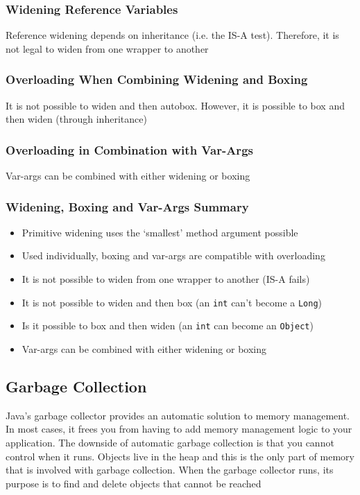 \subsubsection{Widening Reference Variables}
Reference widening depends on inheritance (i.e. the IS-A test). Therefore, it 
is not legal to widen from one wrapper to another

\subsubsection{Overloading When Combining Widening and Boxing}
It is not possible to widen and then autobox. However, it is possible to box 
and then widen (through inheritance)

\subsubsection{Overloading in Combination with Var-Args}
Var-args can be combined with either widening or boxing

\subsubsection{Widening, Boxing and Var-Args Summary}
\begin{itemize}
    \item Primitive widening uses the `smallest' method argument possible
    \item Used individually, boxing and var-args are compatible with 
    overloading
    \item It is not possible to widen from one wrapper to another (IS-A fails)
    \item It is not possible to widen and then box (an \verb#int# can't become 
    a \verb#Long#)
    \item Is it possible to box and then widen (an \verb#int# can become an 
    \verb#Object#)
    \item Var-args can be combined with either widening or boxing
\end{itemize}

\subsection{Garbage Collection}
Java's garbage collector provides an automatic solution to memory management.  
In most cases, it frees you from having to add memory management logic to your 
application. The downside of automatic garbage collection is that you cannot 
control when it runs. Objects live in the heap and this is the only part of 
memory that is involved with garbage collection. When the garbage collector 
runs, its purpose is to find and delete objects that cannot be reached


